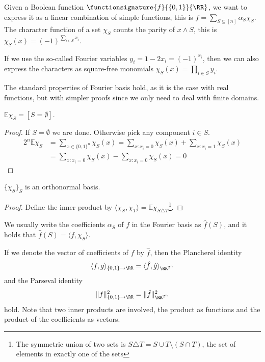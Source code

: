 \documentclass[a4paper,twoside,justified]{tufte-handout}
\begin{document}
Given a Boolean function $\functionsignature{f}{\{0,1\}}{\RR}$, we want to express it as a linear combination of simple functions, this is $f = \sum_{S \subseteq [n]} \alpha_S \chi_S$. The character function of a set $\chi_S$ counts the parity of $x \land S$, this is $\chi_S(x) = (-1)^{\sum_{i\in S} x_i}$.

If we use the so-called Fourier variables $y_i = 1-2x_i = (-1)^{x_i}$, then we can also express the characters as square-free monomials $\chi_S(x) = \prod_{i\in S} y_i$.

The standard properties of Fourier basis hold, as it is the case with real functions, but with simpler proofs since we only need to deal with finite domains.

\begin{lemma}
  $\mathbb{E} \chi_S = [S=\emptyset]$.
\end{lemma}
\begin{proof}
  If $S=\emptyset$ we are done. Otherwise pick any component $i\in S$.
\begin{align}
2^n \mathbb{E} \chi_S &=
\sum_{x \in \{0,1\}^n} \chi_S(x) = 
\sum_{x : x_i = 0} \chi_S(x) + \sum_{x : x_i = 1} \chi_S(x) \\ &= 
\sum_{x : x_i = 0} \chi_S(x) - \sum_{x : x_i = 0} \chi_S(x) = 0
\end{align}
\end{proof}

\begin{lemma}
  $\{\chi_S\}_S$ is an orthonormal basis.
\end{lemma}
\begin{proof}
  Define the inner product by $\langle \chi_S, \chi_T \rangle = \mathbb{E}\chi_{S \triangle T}$\footnote{The symmetric union of two sets is $S \triangle T = S \cup T \setminus (S \cap T)$, the set of elements in exactly one of the sets}.
\end{proof}

We usually write the coefficients $\alpha_S$ of $f$ in the Fourier basis as $\hat{f}(S)$, and it holds that $\hat{f}(S) = \langle f,\chi_S \rangle$.

If we denote the vector of coefficients of $f$ by $\hat f$, then the Plancherel identity
\begin{equation}\langle f,g \rangle_{\{0,1\}\to\RR} = \langle \hat f, \hat g \rangle_{\RR^{2^n}}\end{equation}
and the Parseval identity 
\begin{equation}
\|f\|_{\{0,1\}\to\RR}^2=\|\hat f\|_{\RR^{2^n}}^2
\end{equation}
hold. Note that two inner products are involved, the product as functions and the product of the coefficients as vectors.



\end{document}

